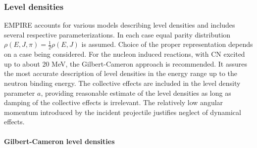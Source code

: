 \subsubsection{Level densities}

EMPIRE accounts for various models describing level densities%
 and includes several respective parameterizations.
In each case equal parity distribution $\rho(E,J,\pi)=%
\frac{1}{2}\rho(E,J)$ is assumed. Choice of the proper representation
depends on a case being considered. For the nucleon induced reactions, with
CN excited up to about 20 MeV, the Gilbert-Cameron approach is recommended.
It assures the most accurate description of level densities in the energy
range up to the neutron binding energy. The collective effects are included
in the level density parameter $a$, providing reasonable estimate of the
level densities as long as damping of the collective effects is irrelevant.
The relatively low angular momentum introduced by the incident projectile
justifies neglect of dynamical effects.

\paragraph{Gilbert-Cameron level densities}

